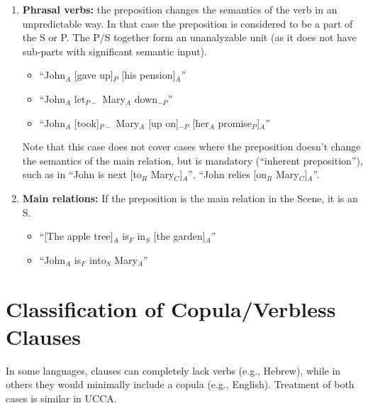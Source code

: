 \documentclass[11pt]{article}
\newcommand{\dcom}[1]{\textit{\color{blue}{#1}}}
\newcommand{\oa}[1]{{\color{blue}{OA: #1}}}
\newcommand{\nss}[1]{}
\begin{document}
\begin{enumerate}
\item
{\bf Phrasal verbs:} the preposition changes the semantics of the verb in an unpredictable way. In that case the preposition is considered to be a part of the S or P. The P/S together form an unanalyzable unit (as it does not have sub-parts with significant semantic input).

\begin{itemize}
\item
``John$_A$ [gave up]$_P$ [his pension]$_A$''
\item
``John$_A$ let$_{P-}$ Mary$_A$ down$_{-P}$''
\item
``John$_A$ [took]$_{P-}$ Mary$_A$ [up on]$_{-P}$ [her$_A$ promise$_P$]$_A$'' 
\end{itemize}

Note that this case does not cover cases where the preposition doesn't change the semantics of the main relation, but is mandatory (``inherent preposition''), such as in ``John is next [to$_R$ Mary$_C$]$_A$'', ``John relies [on$_R$ Mary$_C$]$_A$''. 



\item
{\bf Main relations:} If the preposition is the main relation in the Scene, it is an S. %

\begin{itemize}
\item
``[The apple tree]$_A$ is$_F$ in$_S$ [the garden]$_A$''
\item
``John$_A$ is$_F$ into$_S$ Mary$_A$''
\end{itemize}

\end{enumerate}


\section{Classification of Copula/Verbless Clauses}\label{sec:copula_verbless}

In some languages, clauses can completely lack verbs (e.g., Hebrew), while in others they would minimally include a copula (e.g., English). Treatment of both cases is similar in UCCA.
\end{document}
